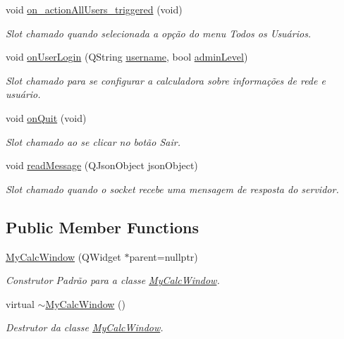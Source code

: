 \begin{DoxyCompactItemize}
void \hyperlink{classMyCalcWindow_ab50a651bb1983993008960ad39d93ed6}{on\+\_\+action\+All\+Users\+\_\+triggered} (void)
\begin{DoxyCompactList}\small\item\em Slot chamado quando selecionada a opção do menu \textquotesingle{}Todos os Usuários\textquotesingle{}. \end{DoxyCompactList}\item 
void \hyperlink{classMyCalcWindow_afb652f194d2ece60f37232f23bf05ec9}{on\+User\+Login} (Q\+String \hyperlink{classMyCalcWindow_aaa828b24dd233138d200de623762e95c}{username}, bool \hyperlink{classMyCalcWindow_a80f22185e35ea4a28825b0d2518df67c}{admin\+Level})
\begin{DoxyCompactList}\small\item\em Slot chamado para se configurar a calculadora sobre informações de rede e usuário. \end{DoxyCompactList}\item 
void \hyperlink{classMyCalcWindow_a809b1da213d1424ba098c1f0ee2d0bd5}{on\+Quit} (void)\hypertarget{classMyCalcWindow_a809b1da213d1424ba098c1f0ee2d0bd5}{}\label{classMyCalcWindow_a809b1da213d1424ba098c1f0ee2d0bd5}

\begin{DoxyCompactList}\small\item\em Slot chamado ao se clicar no botão \textquotesingle{}Sair\textquotesingle{}. \end{DoxyCompactList}\item 
void \hyperlink{classMyCalcWindow_aaa868eba4e3ee5a52d28c0c34bbbd8cd}{read\+Message} (Q\+Json\+Object json\+Object)
\begin{DoxyCompactList}\small\item\em Slot chamado quando o socket recebe uma mensagem de resposta do servidor. \end{DoxyCompactList}\end{DoxyCompactItemize}
\subsection*{Public Member Functions}
\begin{DoxyCompactItemize}
\item 
\hyperlink{classMyCalcWindow_ac205ab2dbfbf802859774a090b066518}{My\+Calc\+Window} (Q\+Widget $\ast$parent=nullptr)
\begin{DoxyCompactList}\small\item\em Construtor Padrão para a classe \hyperlink{classMyCalcWindow}{My\+Calc\+Window}. \end{DoxyCompactList}\item 
virtual \hyperlink{classMyCalcWindow_a6226362b86860c067418d16b7da1e1e2}{$\sim$\+My\+Calc\+Window} ()
\begin{DoxyCompactList}\small\item\em Destrutor da classe \hyperlink{classMyCalcWindow}{My\+Calc\+Window}. \end{DoxyCompactList}\end{DoxyCompactItemize}
